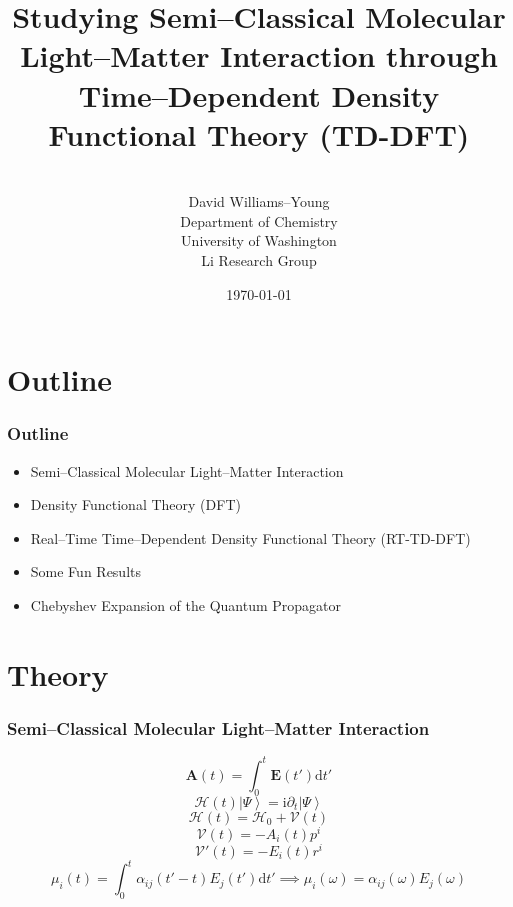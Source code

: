 \documentclass{beamer}
\title[]{Studying Semi--Classical Molecular Light--Matter Interaction through
Time--Dependent Density Functional Theory (TD-DFT)}
\author[Li Research Group, University of Washington]{
\\[1\baselineskip]
David Williams--Young \\
Department of Chemistry \\
University of Washington \\
Li Research Group
}
\date{\today}
\newcommand{\ket}[1]{\left \vert #1 \right \rangle}
\begin{document}
\begin{frame}
\titlepage
\end{frame}


\section{Outline}


\begin{frame}
\frametitle{Outline}

\begin{itemize}
  \item Semi--Classical Molecular Light--Matter Interaction 
  \item Density Functional Theory (DFT)
  \item Real--Time Time--Dependent Density Functional Theory (RT-TD-DFT)
  \item Some Fun Results
  \item Chebyshev Expansion of the Quantum Propagator
\end{itemize}
\end{frame}

\section{Theory}

\begin{frame}
\frametitle{Semi--Classical Molecular Light--Matter Interaction}
\begin{equation*}
\mathbf{A}(t) = \int_{0}^t \mathbf{E}(t') \mathrm{d}t'
\end{equation*}
\begin{equation*}
\mathcal{H}(t)\ket{\Psi} = \mathrm{i}\partial_t\ket{\Psi}
\end{equation*}
\begin{equation*}
\mathcal{H}(t) = \mathcal{H}_0 + \mathcal{V}(t)
\end{equation*}
\begin{equation*}
\mathcal{V}(t) = -A_i(t) p^i
\end{equation*}
\begin{equation*}
\mathcal{V}'(t) = - E_i(t) r^i
\end{equation*}
\begin{equation*}
\mu_i(t) = \int_0^t \alpha_{ij}(t' -t) E_j(t') \mathrm{d}t' \implies \mu_i(\omega) = \alpha_{ij}(\omega) E_j(\omega)
\end{equation*}
\end{frame}
\end{document}
